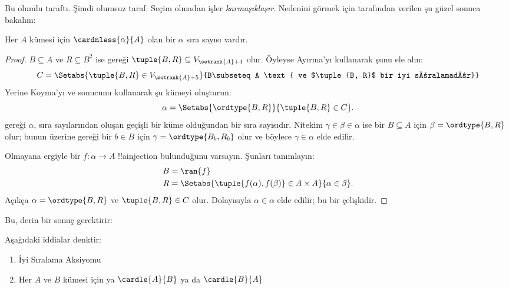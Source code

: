 


Bu olumlu taraftı. Şimdi olumsuz taraf: Seçim olmadan işler
\emph{karmaşıklaşır}. Nedenini görmek için \cite{Hartogs1915} tarafından
verilen şu güzel sonuca bakalım:

\begin{lem}
Her $A$ kümesi için $\cardnless{\alpha}{A}$ olan bir $\alpha$ sıra sayısı
vardır.
\end{lem}

\begin{proof}
$B\subseteq A$ ve $R\subseteq B^2$ ise
 gereği
$\tuple{B,R}\subseteq V_{\setrank{A}+4}$ olur. Öyleyse Ayırma'yı kullanarak
şunu ele alın:
\[
	C = \Setabs{\tuple{B, R} \in V_{\setrank{A}+5}}{B\subseteq A
	\text{ ve $\tuple{B, R}$ bir iyi sıralamadır}}
\]
Yerine Koyma'yı ve
 sonucunu kullanarak
şu kümeyi oluşturun:
\[
	\alpha = \Setabs{\ordtype{B, R}}{\tuple{B, R} \in C}.
\]
 gereği $\alpha$, sıra
sayılarından oluşan geçişli bir küme olduğundan bir sıra sayısıdır.
Nitekim $\gamma\in\beta\in\alpha$ ise bir $B\subseteq A$ için
$\beta=\ordtype{B,R}$ olur; bunun üzerine
 gereği bir $b\in B$ için
$\gamma=\ordtype{B_b,R_b}$ olur ve böylece $\gamma\in\alpha$ elde edilir.

Olmayana ergiyle bir $f\colon\alpha\to A$ !!a{injection} bulunduğunu
varsayın. Şunları tanımlayın:
\begin{align*}
	B &= \ran{f}\\
	R &= \Setabs{\tuple{f(\alpha), f(\beta)} \in A \times A}{\alpha \in \beta}.
\end{align*}
Açıkça $\alpha=\ordtype{B,R}$ ve $\tuple{B,R}\in C$ olur. Dolayısıyla
$\alpha\in\alpha$ elde edilir; bu bir çelişkidir.
\end{proof}

Bu, derin bir sonuç gerektirir:

\begin{thm}
Aşağıdaki iddialar denktir:
\begin{enumerate}
	\item{} İyi Sıralama Aksiyomu
	\item{} Her $A$ ve $B$ kümesi için ya
	$\cardle{A}{B}$ ya da $\cardle{B}{A}$
\end{enumerate}
\end{thm}

